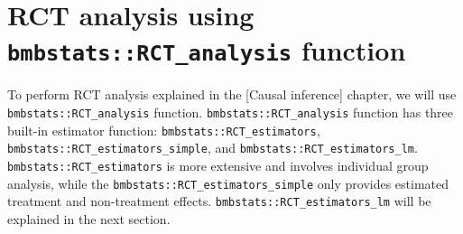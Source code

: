 \documentclass[
]{book}
\begin{document}
\hypertarget{rct-analysis-using-bmbstatsrct_analysis-function}{%
\section{\texorpdfstring{RCT analysis using \texttt{bmbstats::RCT\_analysis} function}{RCT analysis using bmbstats::RCT\_analysis function}}\label{rct-analysis-using-bmbstatsrct_analysis-function}}

To perform RCT analysis explained in the {[}Causal inference{]} chapter, we will use \texttt{bmbstats::RCT\_analysis} function. \texttt{bmbstats::RCT\_analysis} function has three built-in estimator function: \texttt{bmbstats::RCT\_estimators}, \texttt{bmbstats::RCT\_estimators\_simple}, and \texttt{bmbstats::RCT\_estimators\_lm}. \texttt{bmbstats::RCT\_estimators} is more extensive and involves individual group analysis, while the \texttt{bmbstats::RCT\_estimators\_simple} only provides estimated treatment and non-treatment effects. \texttt{bmbstats::RCT\_estimators\_lm} will be explained in the next section.
\end{document}
